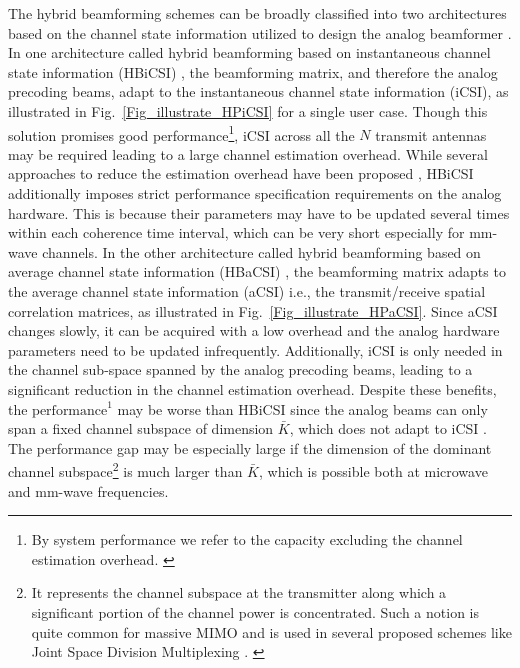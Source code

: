 \documentclass[journal,comsoc]{IEEEtran}
\begin{document}
The hybrid beamforming schemes can be broadly classified into two architectures based on the channel state information utilized to design the analog beamformer \cite{Molisch_HP_mag}. In one architecture called hybrid beamforming based on instantaneous channel state information (HBiCSI) \cite{Molisch_VarPhaseShift, Karamalis2006, Ayach_iCSI, Xu_iCSI, Alkhateeb2015, Yu2016, Sohrabi2016}, the beamforming matrix, and therefore the analog precoding beams, adapt to the instantaneous channel state information (iCSI), as illustrated in Fig.~\ref{Fig_illustrate_HPiCSI} for a single user case. Though this solution promises good performance\footnote{By system performance we refer to the capacity excluding the channel estimation overhead. \label{note1}}, iCSI across all the $N$ transmit antennas may be required leading to a large channel estimation overhead. While several approaches to reduce the estimation overhead have been proposed \cite{Adhikary_JSDM, Alkhateeb2014, Rial2016, Ratnam_ICC2018}, HBiCSI additionally imposes strict performance specification requirements on the analog hardware. This is because their parameters may have to be updated several times within each coherence time interval, which can be very short especially for mm-wave channels. 
%
In the other architecture called hybrid beamforming based on average channel state information (HBaCSI) \cite{Sudarshan, venkateswaran2010analog, Alkhateeb2013, Adhikary_JSDM, Liu2014, Park2017, Li2017}, the beamforming matrix adapts to the average channel state information (aCSI) i.e., the transmit/receive spatial correlation matrices, as illustrated in Fig.~\ref{Fig_illustrate_HPaCSI}. Since aCSI changes slowly, it can be acquired with a low overhead and the analog hardware parameters need to be updated infrequently. Additionally, iCSI is only needed in the channel sub-space spanned by the analog precoding beams, leading to a significant reduction in the channel estimation overhead. 
Despite these benefits, the $\text{performance}^{1}$ may be worse than HBiCSI since the analog beams can only span a fixed channel subspace of dimension $\bar{K}$, which does not adapt to iCSI \cite{Adhikary_JSDM}. The performance gap may be especially large if the dimension of the dominant channel subspace\footnote{It represents the channel subspace at the transmitter along which a significant portion of the channel power is concentrated. Such a notion is quite common for massive MIMO and is used in several proposed schemes like Joint Space Division Multiplexing \cite{Adhikary_JSDM}. \label{note_dominant}} is much larger than $\bar{K}$, which is possible both at microwave \cite{TR36_873} and mm-wave \cite{Akdeniz} frequencies. 
\end{document}
